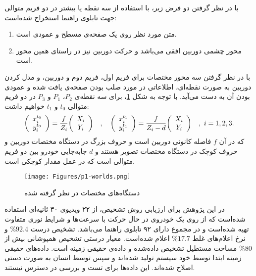 \documentclass[oneside,openany,msc]{SBU-Thesis}
\begin{document}
	با در نظر گرفتن دو فرض زیر، با استفاده از سه نقطه یا بیشتر در دو فریم متوالی جهت تابلوی راهنما استخراج شده‌است: 
	\begin{enumerate}
		\item متن مورد نظر روی یک صفحه‌ی مسطح و عمودی است.
		\item محور چشمی دوربین افقی می‌باشد و حرکت دوربین نیز در راستای همین محور است.
	\end{enumerate}
	با در نظر گرفتن سه محور مختصات برای فریم اول، فریم دوم و دوربین، و مدل کردن دوربین به صورت نقطه‌ای، اطلاعاتی در مورد صلب بودن صفحه‌ی یافت شده و عمودی بودن آن به دست می‌آید. با توجه به شکل \ref{fig:p1-worlds}، برای سه نقطه‌ی $P_2$، $P_1$ و $P_3$ در دو فریم متوالی $t_0$ و $t_1$ خواهیم داشت: 
	\begin{equation}
	{\left( \begin{array}{c}
		x_i^{t_0} \\
		y_i^{t_0} \end{array} \right) } = {f \over Z_i}
	{
		\left( \begin{array}{c}
		X_i \\
		Y_i \end{array} \right) } \quad , \quad 
	{\left( \begin{array}{c}
		x_i^{t_1} \\
		y_i^{t_1} \end{array} \right) } = {{f} \over {Z_i - d }}
	{
		\left( \begin{array}{c}
		X_i \\
		Y_i \end{array} \right) } \quad , \ i = 1, 2, 3.
	\end{equation}
	که در آن $f$ فاصله کانونی دوربین است و حروف بزرگ در دستگاه مختصات دوربین و حروف کوچک در دستگاه مختصات تصویر هستند و $d$ جابه‌جایی خودرو بین دو فریم متوالی است که در عمل مقدار کوچکی است.
	\begin{figure}[t]
		\centering
		\texttt{[image: Figures/p1-worlds.png]}
		\caption[دستگاه‌های مختصات]{دستگاه‌های مختصات در نظر گرفته شده \cite{Wu2005}}
		\label{fig:p1-worlds}
	\end{figure}
	در این پژوهش برای ارزیابی روش تشخیص، از ۲۲ ویدیوی ۳۰ ثانیه‌ای استفاده شده‌است که از روی یک خودروی در حال حرکت با سرعت‌ها و شرایط نوری متفاوت تهیه شده‌است و در مجموع دارای ۹۲ تابلوی راهنما می‌باشد. تشخیص درست 
	$\% 92.4$ 
	و نرخ اعلام‌های غلط 
	$\% 17.7$
	اعلام شده‌است. معیار درستی تشخیص همپوشانی بیش از $\% 80$ مساحت مستطیل تشخیص‌ داده‌شده و داده‌ی حقیقی زمینه‌ است. داده‌های حقیقی زمینه ابتدا توسط خود سیستم تولید شده‌اند و سپس توسط انسان به صورت دستی اصلاح شده‌اند. این داده‌ها برای تست و بررسی در دسترس نیستند.
\end{document}
